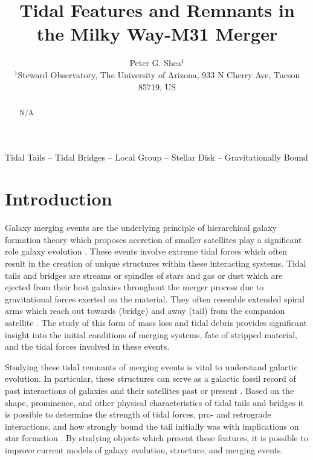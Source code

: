 \documentclass[fleqn,usenatbib]{mnras}
\title{Tidal Features and Remnants in the Milky Way-M31 Merger}
\author[P. G. Shea]{
Peter G. Shea$^{1}$
\\
$^{1}$Steward Observatory, The University of Arizona, 933 N Cherry Ave, Tucson 85719, US\\
}
\begin{document}
\label{firstpage}
\pagerange{\pageref{firstpage}--\pageref{lastpage}}
\maketitle

\begin{abstract}
N/A
\end{abstract}

\begin{keywords}
Tidal Tails -- Tidal Bridges -- Local Group -- Stellar Disk -- Gravitationally Bound
\end{keywords}



\section{Introduction}


Galaxy merging events are the underlying principle of hierarchical galaxy formation theory which proposes accretion of smaller satellites play a significant role galaxy evolution \cite{Wang_Hammer_Athanassoula_Puech_Yang_Flores_2012}. 
These events involve extreme tidal forces which often result in the creation of unique structures within these interacting systems. 
Tidal tails and bridges are streams or spindles of stars and gas or dust which are ejected from their host galaxies throughout the merger process due to gravitational forces exerted on the material. 
They often resemble extended spiral arms which reach out towards (bridge) and away (tail) from the companion satellite \cite{Toomre_Toomre_1972}. 
The study of this form of mass loss and tidal debris provides significant insight into the initial conditions of merging systems, fate of stripped material, and the tidal forces involved in these events.


Studying these tidal remnants of merging events is vital to understand galactic evolution. In particular, these structures can serve as a galactic fossil record of past interactions of galaxies and their satellites past or present \cite{Wang_Hammer_Athanassoula_Puech_Yang_Flores_2012}.  
Based on the shape, prominence, and other physical characteristics of tidal tails and bridges it is possible to determine the strength of tidal forces, pro- and retrograde interactions, and how strongly bound the tail initially was with implications on star formation \cite{Privon_Barnes_Evans_Hibbard_Yun_Mazzarella_Armus_Surace_2013}. 
By studying objects which present these features, it is possible to improve current models of galaxy evolution, structure, and merging events. 
\end{document}
